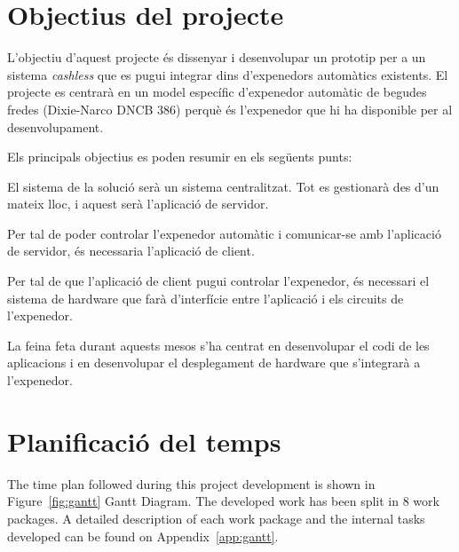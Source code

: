 \section{Objectius del projecte}

L'objectiu d'aquest projecte és dissenyar i desenvolupar un prototip per a un sistema \textit{cashless} que es pugui integrar dins d'expenedors automàtics existents. El projecte es centrarà en un model específic d'expenedor automàtic de begudes fredes (Dixie-Narco DNCB 386) perquè és l'expenedor que hi ha disponible per al desenvolupament.

Els principals objectius es poden resumir en els següents punts:

\vspace{-0.5em}
\begin{description}[font=\normalfont\textsl]
\item [Dissenyar i desenvolupar l'aplicació de servidor. ] El sistema de la solució serà un sistema centralitzat. Tot es gestionarà des d'un mateix lloc, i aquest serà l'aplicació de servidor.
\item [Dissenyar i desenvolupar l'aplicació de client. ] Per tal de poder controlar l'expenedor automàtic i comunicar-se amb l'aplicació de servidor, és necessaria l'aplicació de client.
\item [Dissenyar  Desenvolupar el sistema de hardware. ] Per tal de que l'aplicació de client pugui controlar l'expenedor, és necessari el sistema de hardware que farà d'interfície entre l'aplicació i els circuits de l'expenedor.
\end{description}

La feina feta durant aquests mesos s'ha centrat en desenvolupar el codi de les aplicacions i en desenvolupar el desplegament de hardware que s'integrarà a l'expenedor.

\section{Planificació del temps}

The time plan followed during this project development is shown in Figure~\ref{fig:gantt} Gantt Diagram. The developed work has been split in 8 work packages. A detailed description of each work package and the internal tasks developed can be found on Appendix~\ref{app:gantt}. 

